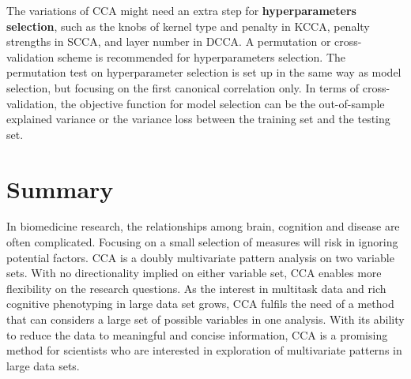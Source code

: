 The variations of CCA might need an extra step for \textbf{hyperparameters selection}, such as the knobs of kernel type and penalty in KCCA, penalty strengths in SCCA, and layer number in DCCA. A permutation or cross-validation scheme is recommended for hyperparameters selection. The permutation test on hyperparameter selection is set up in the same way as model selection, but focusing on the first canonical correlation only\cite<For example, see Appendix A in>{WittenSCCA2009}. In terms of cross-validation, the objective function for model selection can be the out-of-sample explained variance or the variance loss between the training set and the testing set. 

\section{Summary}
\label{ch:methods:summary}
In biomedicine research, the relationships among brain, cognition and disease are often complicated. Focusing on a small selection of measures will risk in ignoring potential factors. CCA is a doubly multivariate pattern analysis on two variable sets.  With no directionality implied on either variable set, CCA enables more flexibility on the research questions. As the interest in multitask data and rich cognitive phenotyping in large data set grows, CCA fulfils the need of a method that can considers a large set of possible variables in one analysis. With its ability to reduce the data to meaningful and concise information, CCA is a promising method for scientists who are interested in exploration of multivariate patterns in large data sets.